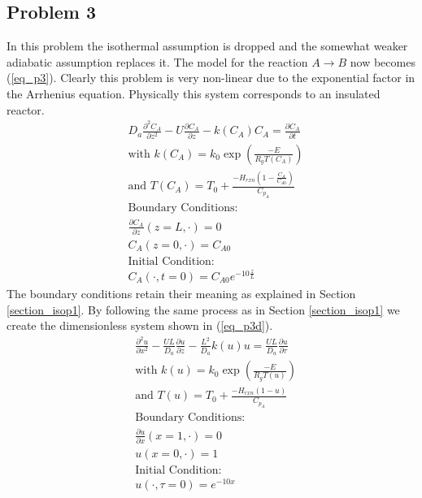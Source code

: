 \documentclass[11pt,fleqn]{article}
\theoremstyle{defstyle}
\begin{document}
\subsection{Problem 3}
\label{section_p3}
In this problem the isothermal assumption is dropped and the somewhat weaker adiabatic assumption replaces it. The model for the reaction $A \rightarrow B$ now becomes (\ref{eq_p3}). Clearly this problem is very non-linear due to the exponential factor in the 
Arrhenius equation. Physically this system corresponds to an insulated reactor.
\begin{equation}
\begin{aligned}
&D_a \frac{\partial^2 C_A}{\partial z^2} - U \frac{\partial C_A}{\partial z} - k(C_A)
C_A = \frac{\partial C_A}{\partial t} \\
& \text{with }k(C_A) = k_0 \exp \left(\frac{-E}{R_gT(C_A)}\right) \\
& \text{and } T(C_A) = T_0 + \frac{-H_{rxn} \left(1-\frac{C_A}{C_{A0}}\right)}{C_{p_A}} \\
&\text{Boundary Conditions:} \\
&\frac{\partial C_A}{\partial z}(z=L, \cdot) = 0\\
&C_A(z=0, \cdot) = C_{A0} \\
&\text{Initial Condition:} \\
& C_A(\cdot, t= 0) = C_{A0}e^{-10\frac{z}{L}}
\end{aligned}
\label{eq_p3}
\end{equation}
The boundary conditions retain their meaning as explained in Section \ref{section_isop1}. By following the same process as in Section \ref{section_isop1} we create the dimensionless system shown in (\ref{eq_p3d}).
\begin{equation}
\begin{aligned}
&\frac{\partial^2 u}{\partial x^2} - \frac{UL}{D_a}\frac{\partial u}{\partial z} - \frac{L^2}{D_a} k(u)u = \frac{UL}{D_a}\frac{\partial u}{\partial \tau} \\
& \text{with }k(u) = k_0 \exp\left(\frac{-E}{R_gT(u)}\right) \\
& \text{and } T(u) = T_0 + \frac{-H_{rxn} \left(1-u\right)}{C_{p_A}} \\
&\text{Boundary Conditions:} \\
&\frac{\partial u}{\partial x}(x=1, \cdot) = 0\\
&u(x=0, \cdot) = 1 \\
&\text{Initial Condition:} \\
& u(\cdot, \tau= 0) = e^{-10x}
\end{aligned}
\label{eq_p3d}
\end{equation}
\end{document}
